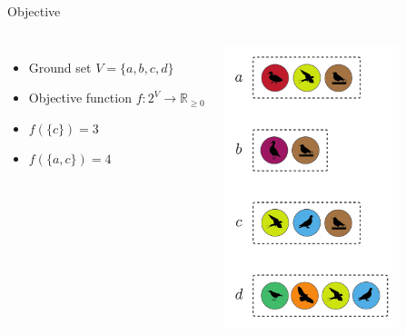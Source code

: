 \documentclass[xetex,10pt,mathserif]{beamer}
\begin{document}
\begin{frame}{Objective}
\begin{columns}[c]
\begin{itemize}
\item Ground set $V = \{a, b, c, d\}$
\vspace{2em}
\item Objective function $f : 2^V \to \mathbb{R}_{\geq 0}$
\vspace{2em}
\item $f(\{c\}) = 3$
\vspace{2em}
\item $f(\{a, c\}) = 4$
\end{itemize}
\centering
\includegraphics[width=2in]{figures/sets.pdf}
\end{columns}
\end{frame}
\end{document}
